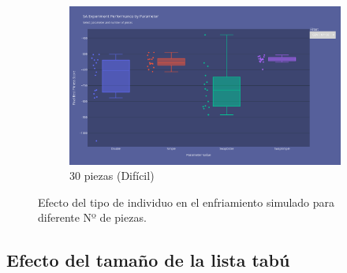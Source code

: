 \documentclass[11pt,spanish,listoffigures,listoftables]{tfgetsinf}
\begin{document}
\begin{figure}[H]
    \vspace{0.5cm}
    
    \begin{subfigure}[b]{0.48\textwidth}
        \centering
        \includegraphics[width=\textwidth]{images/SA_np-30_movements.png}
        \caption{30 piezas (Difícil)}
        \label{fig:sa_np30_movements}
    \end{subfigure}
    \caption{Efecto del tipo de individuo en el enfriamiento simulado para diferente Nº de piezas.}
    \label{fig:sa_movements}
\end{figure}

\subsection{Efecto del tamaño de la lista tabú}

\end{document}
